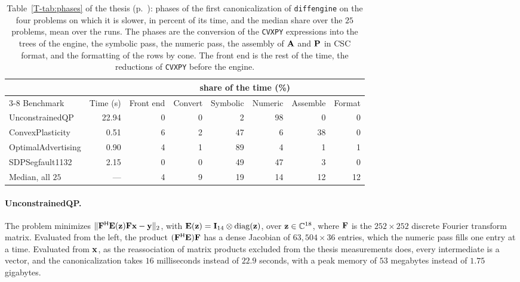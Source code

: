 \documentclass[letterpaper,12pt]{article}
\newcommand{\tpage}[1]{p.~\pageref{T-#1}}
\begin{document}
\begin{table}[htbp]
\centering
\caption{Table~\ref{T-tab:phases} of the thesis (\tpage{tab:phases}): phases of the first
canonicalization of \texttt{diffengine} on the four problems on which it is slower, in percent of
its time, and the median share over the $25$ problems, mean over the runs. The phases are the
conversion of the \texttt{CVXPY} expressions into the trees of the engine, the symbolic pass, the
numeric pass, the assembly of $\mathbf{A}$ and $\mathbf{P}$ in CSC format, and the formatting of the
rows by cone. The front end is the rest of the time, the reductions of \texttt{CVXPY} before the
engine.}
\label{tab:sup-phases}
{\small
\setlength{\tabcolsep}{4pt}
\begin{tabular}{l r rrrrrr}
\toprule
& & \multicolumn{6}{c}{share of the time (\%)} \\
\cmidrule(lr){3-8}
Benchmark & Time (s) & Front end & Convert & Symbolic & Numeric & Assemble & Format \\
\midrule
UnconstrainedQP      & 22.94 & 0 & 0 & 2 & 98 & 0 & 0 \\
ConvexPlasticity     & 0.51 & 6 & 2 & 47 & 6 & 38 & 0 \\
OptimalAdvertising   & 0.90 & 4 & 1 & 89 & 4 & 1 & 1 \\
SDPSegfault1132      & 2.15 & 0 & 0 & 49 & 47 & 3 & 0 \\
\midrule
Median, all $25$     & ---  & 4 & 9 & 19 & 14 & 12 & 12 \\
\bottomrule
\end{tabular}}
\end{table}

\paragraph{UnconstrainedQP.} The problem minimizes
$\lVert \mathbf{F}^{\mathsf{H}} \mathbf{E}(\mathbf{z}) \mathbf{F} \mathbf{x} - \mathbf{y} \rVert_2$, with
$\mathbf{E}(\mathbf{z}) = \mathbf{I}_{14} \otimes \mathop{\mathrm{diag}}(\mathbf{z})$, over $\mathbf{z} \in \mathbb{C}^{18}$,
where $\mathbf{F}$ is the $252 \times 252$ discrete Fourier transform matrix. Evaluated from the
left, the product $(\mathbf{F}^{\mathsf{H}} \mathbf{E}) \mathbf{F}$ has a dense Jacobian of
$63{,}504 \times 36$ entries, which the numeric pass fills one entry at a time. Evaluated from
$\mathbf{x}$, as the reassociation of matrix products excluded from the thesis measurements does,
every intermediate is a vector, and the canonicalization takes $16$ milliseconds instead of
$22.9$ seconds, with a peak memory of $53$ megabytes instead of $1.75$ gigabytes.
\end{document}
